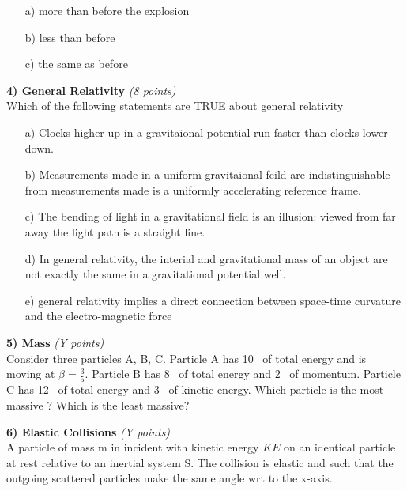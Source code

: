 {\begin{itemize}
\item[a)] more than before the explosion
\item[b)] less than before
\item[c)] the same as before
\end{itemize}


\clearpage

\textbf{4) General Relativity }\hfill \textit{(8 points)}\\
Which of the following statements are TRUE about general relativity
\begin{itemize}
\item[a)] Clocks higher up in a gravitaional potential run faster than clocks lower down.
\item[b)] Measurements made in a uniform gravitaional feild are indistinguishable from measurements made is a uniformly accelerating reference frame.
\item[c)] The bending of light in a gravitational field is an illusion: viewed from far away the light path is a straight line.
\item[d)] In general relativity, the interial and gravitational mass of an object are not exactly the same in a gravitational potential well.
\item[e)] general relativity implies a direct connection between space-time curvature and the electro-magnetic force
\end{itemize}

\vspace{0.5in}

\textbf{5) Mass }\hfill \textit{(Y points)}\\

Consider three particles A, B, C.
Particle A has 10 \GeV\ of total energy and is moving at $\beta = \frac{3}{5}$.
Particle B has 8 \GeV\ of total energy and 2 \GeV\ of momentum.
Particle C has 12 \GeV\ of total energy and 3 \GeV\ of kinetic energy.
Which particle is the most massive ?
Which is the least massive?


\vspace{0.1in}

\clearpage

\textbf{6) Elastic Collisions }\hfill \textit{(Y points)}\\
A particle of mass m in incident with kinetic energy $KE$ on an identical particle at rest relative to an inertial system S.
The collision is elastic and such that the outgoing scattered particles make the same angle wrt to the x-axis.  


}

